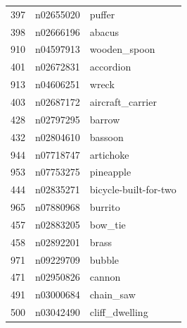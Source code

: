 \begin{table}
\begin{tabular}{cll}
397 & n02655020 & puffer \\
398 & n02666196 & abacus \\
910 & n04597913 & wooden_spoon \\
401 & n02672831 & accordion \\
913 & n04606251 & wreck \\
403 & n02687172 & aircraft_carrier \\
428 & n02797295 & barrow \\
432 & n02804610 & bassoon \\
944 & n07718747 & artichoke \\
953 & n07753275 & pineapple \\
444 & n02835271 & bicycle-built-for-two \\
965 & n07880968 & burrito \\
457 & n02883205 & bow_tie \\
458 & n02892201 & brass \\
971 & n09229709 & bubble \\
471 & n02950826 & cannon \\
491 & n03000684 & chain_saw \\
500 & n03042490 & cliff_dwelling \\
\bottomrule
\end{tabular}
\end{table}
